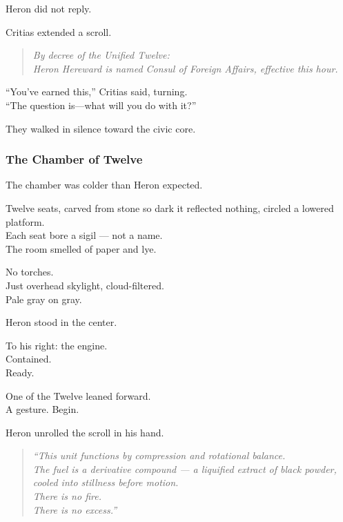 \documentclass[12pt]{article}
\begin{document}
Heron did not reply.

\vspace{1em}

Critias extended a scroll.

\begin{quote}
\textit{By decree of the Unified Twelve:\\
Heron Hereward is named Consul of Foreign Affairs, effective this hour.}
\end{quote}

\vspace{1em}

“You’ve earned this,” Critias said, turning.\\
“The question is—what will you do with it?”

\vspace{1em}

They walked in silence toward the civic core.

\dotfill

\subsubsection*{The Chamber of Twelve}

The chamber was colder than Heron expected.

Twelve seats, carved from stone so dark it reflected nothing, circled a lowered platform.\\
Each seat bore a sigil — not a name.\\
The room smelled of paper and lye.

No torches.\\
Just overhead skylight, cloud-filtered.\\
Pale gray on gray.

Heron stood in the center.

To his right: the engine.\\
Contained.\\
Ready.

\vspace{1em}

One of the Twelve leaned forward.\\
A gesture.  
Begin.

\vspace{1em}

Heron unrolled the scroll in his hand.

\begin{quote}
\textit{“This unit functions by compression and rotational balance.\\
The fuel is a derivative compound — a liquified extract of black powder, cooled into stillness before motion.\\
There is no fire.\\
There is no excess.”}
\end{quote}
\end{document}
